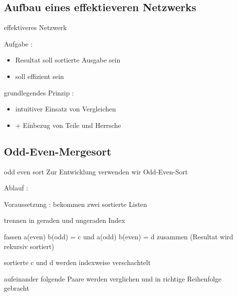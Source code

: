 \documentclass[ucs,9pt]{beamer}
\begin{document}
\subsection*{Aufbau eines effektieveren Netzwerks}
\begin{frame}{effektiveres Netzwerk}
 {Aufgabe :
            \begin{itemize}
                \item Resultat soll sortierte Ausgabe sein
                \item \alert{soll effizient sein}
            \end{itemize}}
 {grundlegendes Prinzip :
            \begin{itemize}
                \item intuitiver Einsatz von Vergleichen
                \item[]\alert{+ Einbezug von Teile und Herrsche}
            \end{itemize}}
\end{frame}

\subsection{Odd-Even-Mergesort}
\begin{frame}{odd even sort}
Zur Entwicklung verwenden wir Odd-Even-Sort\\
\vspace{1cm}
 {Ablauf :
\begin{itemize}
 {\item Voraussetzung : bekommen zwei sortierte Listen}
 {\item trennen in geraden und ungeraden Index}
 {\item fassen a(even) b(odd) = c und a(odd) b(even) = d zusammen (Resultat wird rekursiv sortiert)}
 {\item sortierte c und d werden indexweise verschachtelt}
 {\item aufeinander folgende Paare werden verglichen und in richtige Reihenfolge gebracht}
\end{itemize}}
\end{frame}
\end{document}
